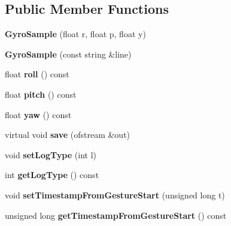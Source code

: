 \subsection*{\-Public \-Member \-Functions}
\begin{DoxyCompactItemize}
\item 
\hypertarget{class_gyro_sample_a5f2b3297cf53498936c2c8fc55b8653b}{{\bfseries \-Gyro\-Sample} (float r, float p, float y)}\label{class_gyro_sample_a5f2b3297cf53498936c2c8fc55b8653b}

\item 
\hypertarget{class_gyro_sample_ab6010043e58217035a655ccbcf8b3d70}{{\bfseries \-Gyro\-Sample} (const string \&line)}\label{class_gyro_sample_ab6010043e58217035a655ccbcf8b3d70}

\item 
\hypertarget{class_gyro_sample_a8360f35fbf6fd9e46f25be49f6fc92cd}{float {\bfseries roll} () const }\label{class_gyro_sample_a8360f35fbf6fd9e46f25be49f6fc92cd}

\item 
\hypertarget{class_gyro_sample_a524cde9a9313320cbcf3e9cb6cb4894e}{float {\bfseries pitch} () const }\label{class_gyro_sample_a524cde9a9313320cbcf3e9cb6cb4894e}

\item 
\hypertarget{class_gyro_sample_a6dcbb6633450bff4f6d322c8b4e3ca06}{float {\bfseries yaw} () const }\label{class_gyro_sample_a6dcbb6633450bff4f6d322c8b4e3ca06}

\item 
\hypertarget{class_gyro_sample_a2f8571fe6f29fc4e28ea582ff9f0cfa7}{virtual void {\bfseries save} (ofstream \&out)}\label{class_gyro_sample_a2f8571fe6f29fc4e28ea582ff9f0cfa7}

\item 
\hypertarget{class_sample_ae728243bef5e290d46a2851ea2ce5fe2}{void {\bfseries set\-Log\-Type} (int l)}\label{class_sample_ae728243bef5e290d46a2851ea2ce5fe2}

\item 
\hypertarget{class_sample_aafff0e8223f3eafa001611a63f194c8a}{int {\bfseries get\-Log\-Type} () const }\label{class_sample_aafff0e8223f3eafa001611a63f194c8a}

\item 
\hypertarget{class_sample_a05edd06782fa94517b8daeb29e12057d}{void {\bfseries set\-Timestamp\-From\-Gesture\-Start} (unsigned long t)}\label{class_sample_a05edd06782fa94517b8daeb29e12057d}

\item 
\hypertarget{class_sample_a94a34fe92c0f8a89485042aaea458d94}{unsigned long {\bfseries get\-Timestamp\-From\-Gesture\-Start} () const }\label{class_sample_a94a34fe92c0f8a89485042aaea458d94}

\end{DoxyCompactItemize}
